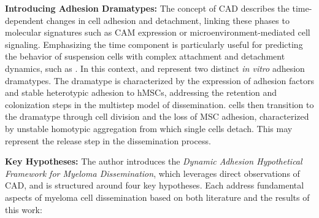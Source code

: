 \textbf{Introducing Adhesion Dramatypes:} The concept of
\ac{CAD} describes the time-dependent changes in cell adhesion
and detachment, linking these phases to molecular signatures such as \ac{CAM}
expression or microenvironment-mediated cell signaling. Emphasizing the time
component is particularly useful for predicting the behavior of suspension cells
with complex attachment and detachment dynamics, such as \INA. In this context,
\MAina and \nMAina represent two distinct \textit{in vitro} adhesion dramatypes.
The \MAina dramatype is characterized by the expression of adhesion factors and
stable heterotypic adhesion to \acp{hMSC}, addressing the retention and
colonization steps in the multistep model of dissemination. \MAina cells then
transition to the \nMAina dramatype through cell division and the loss of MSC
adhesion, characterized by unstable homotypic aggregation from which single
cells detach. This may represent the release step in the dissemination process.


\textbf{Key Hypotheses:}
The author introduces the \emph{Dynamic Adhesion Hypothetical Framework for
      Myeloma Dissemination}, which leverages direct observations of
\ac{CAD}, and is structured around four key hypotheses. Each
address fundamental aspects of myeloma cell dissemination based on both
literature and the results of this work:



\newcommand{\caddramatype}{ %
      \textbf{Myeloma cells change their adhesion dramatype during dissemination.}
      In response to different environmental cues faced during dissemination,
      myeloma cells switch, change or adapt their \ac{CAD}. These states are
      characterized by adhesion dramatpyes\footref{foot:adhesiondt}. Different
      steps in dissemination involve distinct adhesion dramatypes, or instance,
      one for specialized colonizing new sites and one specialized for vascular
      interactions. %
}%
\newcommand{\caddramatypetitle}{ %
      \textit{Hypothesis 1}: Cells Change their Adhesion Dramatype during Dissemination%
}%


\newcommand{\cadplasticity}{ %
      \textbf{Rapid changes of adhesional dramatypes drives aggressive dissemination in myeloma.}
      Adhesional plasticity describes the overall repertoire of adhesion
      dramatypes\footref{foot:adhesiondt} that individual myeloma cells can
      deploy. However, such plasticity is limited by the rapidness of deploying
      a specialized adhesion dramatype during steps of dissemination.
}%
\newcommand{\cadplasticitytitle}{ %
      \textit{Hypothesis 2}: Rapid Adhesional Plasticity Drives Aggression in Myeloma %
}%


